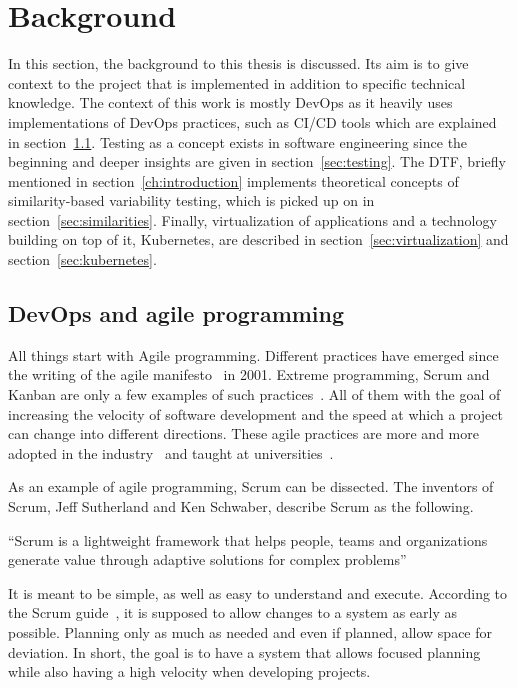 \chapter{Background}\label{ch:background}

In this section, the background to this thesis is discussed.
Its aim is to give context to the project that is implemented in addition to specific technical knowledge.
The context of this work is mostly DevOps as it heavily uses implementations of DevOps practices, such as CI/CD tools which are explained in section~\ref{sec:devops-and-agile-programming}.
Testing as a concept exists in software engineering since the beginning and deeper insights are given in section~\ref{sec:testing}.
The DTF, briefly mentioned in section~\ref{ch:introduction} implements theoretical concepts of similarity-based variability testing, which is picked up on in section~\ref{sec:similarities}.
Finally, virtualization of applications and a technology building on top of it, Kubernetes, are described in section~\ref{sec:virtualization} and section~\ref{sec:kubernetes}.

\section{DevOps and agile programming}\label{sec:devops-and-agile-programming}

All things start with Agile programming.
Different practices have emerged since the writing of the agile manifesto~\cite{AgileManifesto} in 2001.
Extreme programming, Scrum and Kanban are only a few examples of such practices~\cite{ADecadeOfAgileMethodologies}.
All of them with the goal of increasing the velocity of software development and the speed at which a project can change into different directions.
These agile practices are more and more adopted in the industry~\cite{BecomingAgileTogether} and taught at universities~\cite{StudienhandbuchProjectManagement}.

As an example of agile programming, Scrum can be dissected.
The inventors of Scrum, Jeff Sutherland and Ken Schwaber, describe Scrum as the following.

``Scrum is a lightweight framework that helps people, teams and organizations generate value through
adaptive solutions for complex problems''~\cite{the-scrum-guide}

It is meant to be simple, as well as easy to understand and execute.
According to the Scrum guide~\cite{the-scrum-guide}, it is supposed to allow changes to a system as early as possible.
Planning only as much as needed and even if planned, allow space for deviation.
In short, the goal is to have a system that allows focused planning while also having a high velocity when developing projects.

